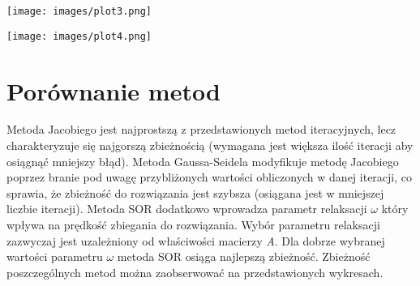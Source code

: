 \documentclass{article}
\begin{document}
\clearpage

\texttt{[image: images/plot3.png]}

\texttt{[image: images/plot4.png]}

\clearpage

\section{Porównanie metod}
Metoda Jacobiego jest najprostszą z przedstawionych metod iteracyjnych, lecz charakteryzuje się najgorszą zbieżnością (wymagana jest większa ilość iteracji aby osiągnąć mniejszy błąd). Metoda Gaussa-Seidela modyfikuje metodę Jacobiego poprzez branie pod uwagę przybliżonych wartości obliczonych w danej iteracji, co sprawia, że zbieżność do rozwiązania jest szybsza (osiągana jest w mniejszej liczbie iteracji). Metoda SOR dodatkowo wprowadza parametr relaksacji \(\omega\) który wpływa na prędkość zbiegania do rozwiązania. Wybór parametru relaksacji zazwyczaj jest uzależniony od właściwości macierzy \emph{A}. Dla dobrze wybranej wartości parametru \(\omega\) metoda SOR osiąga najlepszą zbieżność. Zbieżność poszczególnych metod można zaobserwować na przedstawionych wykresach.
\end{document}
